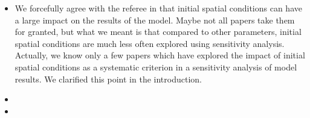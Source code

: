\documentclass[11pt,a4paper,sans]{moderncv}        %
\begin{document}
\begin{itemize}
	\item We forcefully agree with the referee in that initial spatial conditions can have a large impact on the results of the model. Maybe not all papers take them for granted, but what we meant is that compared to other parameters, initial spatial conditions are much less often explored using sensitivity analysis. Actually, we know only a few papers which have explored the impact of initial spatial conditions as a systematic criterion in a sensitivity analysis of model results. We clarified this point in the introduction.

	\item {}
	
	\item {}
	

\end{itemize}
\end{document}
